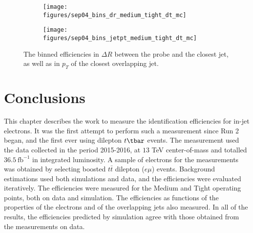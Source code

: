 \begin{figure}
	\begin{subfigure}{0.5\textwidth}
		\texttt{[image: figures/sep04\_bins\_dr\_medium\_tight\_dt\_mc]}
	\end{subfigure}
	\begin{subfigure}{0.5\textwidth}
		\texttt{[image: figures/sep04\_bins\_jetpt\_medium\_tight\_dt\_mc]}
	\end{subfigure}

	\centering
	\caption{The binned efficiencies in $\Delta R$ between the probe and the closest jet,
		as well as in $p_T$ of the closest overlapping jet.}
	\label{f:binspt02}
\end{figure}


\section{Conclusions}\label{s:eidcon}

This chapter describes the work to measure the identification efficiencies for
in-jet electrons. It was the first attempt to perform such a measurement since
Run 2 began, and the first ever using dilepton $t\tbar$ events. The measurement
used the data collected in the period 2015-2016, at $13$ TeV center-of-mass and
totalled $36.5~\text{fb}^{-1}$ in integrated luminosity. A sample of electrons
for the measurements was obtained by selecting boosted $t\bar{t}$ dilepton
($e\mu$) events. Background estimations used both simulations and data, and the
efficiencies were evaluated iteratively. The efficiencies were measured for the
Medium and Tight operating points, both on data and simulation. The
efficiencies as functions of the properties of the electrons and of the
overlapping jets also measured. In all of the results, the efficiencies
predicted by simulation agree with those obtained from the measurements on
data.


